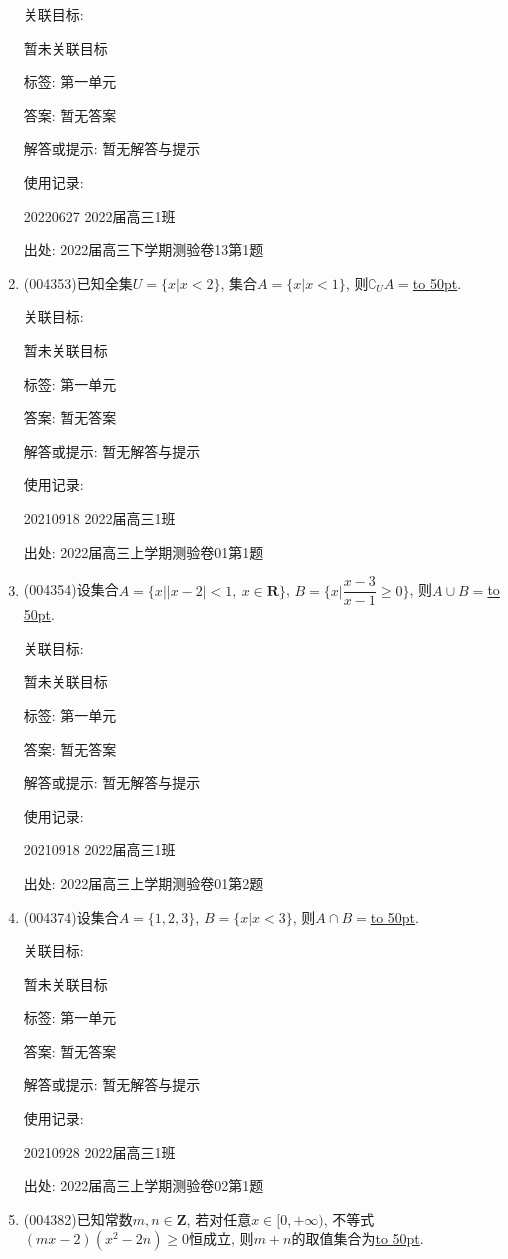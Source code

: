 \documentclass[10pt,a4paper]{article}
\newcommand{\blank}[1]{\underline{\hbox to #1pt{}}}
\begin{document}
\begin{enumerate}[1.]
关联目标:

暂未关联目标



标签: 第一单元

答案: 暂无答案

解答或提示: 暂无解答与提示

使用记录:

20220627	2022届高三1班	


出处: 2022届高三下学期测验卷13第1题
\item { (004353)}已知全集$U=\{x|x<2\}$, 集合$A=\{x|x<1\}$, 则$\complement_UA=$\blank{50}.


关联目标:

暂未关联目标



标签: 第一单元

答案: 暂无答案

解答或提示: 暂无解答与提示

使用记录:

20210918	2022届高三1班	


出处: 2022届高三上学期测验卷01第1题
\item { (004354)}设集合$A=\{x||x-2|<1, \ x\in\mathbf{R}\}$, $B=\{x|\dfrac{x-3}{x-1}\ge 0\}$, 则$A\cup B=$\blank{50}.


关联目标:

暂未关联目标



标签: 第一单元

答案: 暂无答案

解答或提示: 暂无解答与提示

使用记录:

20210918	2022届高三1班	


出处: 2022届高三上学期测验卷01第2题
\item { (004374)}设集合$A=\{1,2,3\}$, $B=\{x|x<3\}$, 则$A\cap B=$\blank{50}.


关联目标:

暂未关联目标



标签: 第一单元

答案: 暂无答案

解答或提示: 暂无解答与提示

使用记录:

20210928	2022届高三1班	


出处: 2022届高三上学期测验卷02第1题
\item { (004382)}已知常数$m,n\in \mathbf{Z}$, 若对任意$x\in [0,+\infty)$, 不等式$(mx-2)(x^2-2n)\ge 0$恒成立, 则$m+n$的取值集合为\blank{50}.



\end{enumerate}
\end{document}
